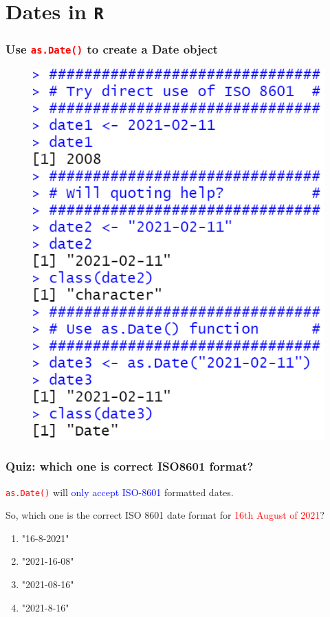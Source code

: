 \documentclass{beamer}
\begin{document}
\section{Dates in \texttt{R}}

\begin{frame}\frametitle{Use \textcolor{red}{\texttt{as.Date()}} to create a Date object}
\begin{figure}
\includegraphics[width=0.60\linewidth]{PlotsLec4/AsDate}
\end{figure}
\end{frame}

\begin{frame}\frametitle{Quiz: which one is correct ISO8601 format?}
\textcolor{red}{\texttt{as.Date()}} will \textcolor{blue}{only accept ISO-8601} formatted dates. 

So, which one is the correct ISO 8601 date format for \textcolor{red}{16th August of 2021}?
{\Large

\begin{enumerate}
\centering
\item "16-8-2021"
\item "2021-16-08"
\item "2021-08-16"
\item "2021-8-16"
\end{enumerate} 
}
\end{frame}
\end{document}
